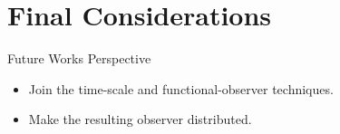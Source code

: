 
\section{Final Considerations}%
\label{sec:conclusion}

\begin{slide}{Future Works Perspective}
  \begin{itemize}
    \item Join the time-scale and functional-observer techniques.
    \item Make the resulting observer distributed.
  \end{itemize}
\end{slide}
